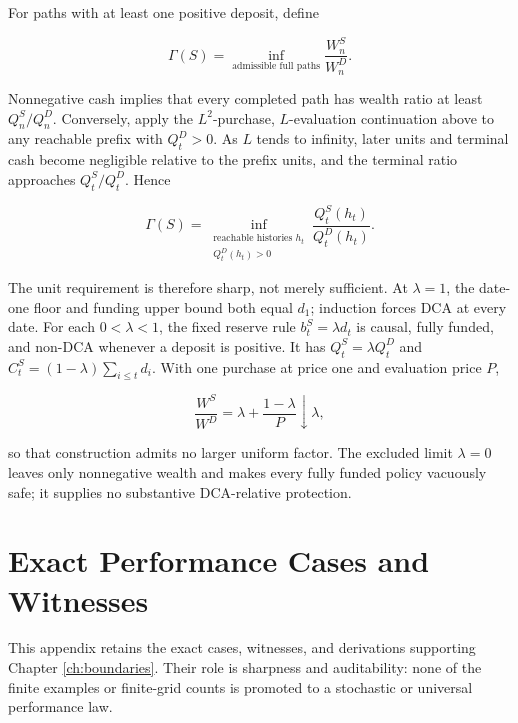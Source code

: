\documentclass[12pt,a4paper,oneside]{report}
\begin{document}
For paths with at least one positive deposit, define

\begin{equation}
  \Gamma(S)=\inf_{\text{admissible full paths}}
  \frac{W_n^S}{W_n^D}.
  \label{eq:proof-worst-case-factor}
\end{equation}

Nonnegative cash implies that every completed path has wealth ratio at least
$Q_n^S/Q_n^D$. Conversely, apply the $L^2$-purchase, $L$-evaluation
continuation above to any reachable prefix with $Q_t^D>0$. As $L$ tends to
infinity, later units and terminal cash become negligible relative to the
prefix units, and the terminal ratio approaches $Q_t^S/Q_t^D$. Hence

\begin{equation}
  \Gamma(S)=
  \inf_{\substack{\text{reachable histories }h_t\\Q_t^D(h_t)>0}}
  \frac{Q_t^S(h_t)}{Q_t^D(h_t)}.
  \label{eq:appendix-exact-safety-factor}
\end{equation}

The unit requirement is therefore sharp, not merely sufficient. At
$\lambda=1$, the date-one floor and funding upper bound both equal $d_1$;
induction forces DCA at every date. For each $0<\lambda<1$, the fixed reserve rule
$b_t^S=\lambda d_t$ is causal, fully funded, and non-DCA whenever a deposit is
positive. It has $Q_t^S=\lambda Q_t^D$ and
$C_t^S=(1-\lambda)\sum_{i\leq t}d_i$. With one purchase at price one and
evaluation price $P$,

\begin{equation}
  \frac{W^S}{W^D}=\lambda+\frac{1-\lambda}{P}\downarrow\lambda,
  \label{eq:proof-floor-sharpness}
\end{equation}

so that construction admits no larger uniform factor. The excluded limit
$\lambda=0$ leaves only nonnegative wealth and makes every fully funded policy
vacuously safe; it supplies no substantive DCA-relative protection.

\chapter{Exact Performance Cases and Witnesses}
\label{app:performance-cases}

This appendix retains the exact cases, witnesses, and derivations supporting
Chapter \ref{ch:boundaries}. Their role is sharpness and auditability: none of
the finite examples or finite-grid counts is promoted to a stochastic or
universal performance law.
\end{document}
